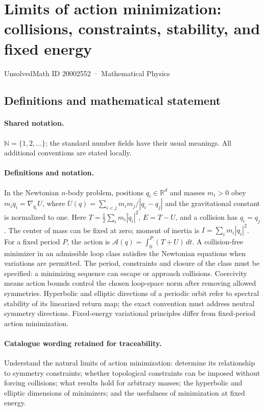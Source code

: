 \documentclass[11pt]{article}
\begin{document}
\setcounter{section}{20002551}
\section{Limits of action minimization: collisions, constraints, stability, and fixed energy}\label{20002552}
{\small UnsolvedMath ID 20002552 · Mathematical Physics}
\subsection{Definitions and mathematical statement}

\paragraph{Shared notation.}$\mathbb N=\{1,2,\ldots\}$; the standard number fields have their usual meanings. All additional conventions are stated locally.


\paragraph{Definitions and notation.}In the Newtonian $n$-body problem, positions $q_i\in\mathbb R^d$ and masses $m_i>0$ obey $m_i\ddot q_i=\nabla_{q_i}U$, where $U(q)=\sum_{i<j}m_im_j/|q_i-q_j|$ and the gravitational constant is normalized to one. Here $T=\tfrac12\sum_i m_i|\dot q_i|^2$, $E=T-U$, and a collision has $q_i=q_j$. The center of mass can be fixed at zero; moment of inertia is $I=\sum_i m_i|q_i|^2$. For a fixed period $P$, the action is $\mathcal A(q)=\int_0^P(T+U)\,dt$. A collision-free minimizer in an admissible loop class satisfies the Newtonian equations when variations are permitted. The period, constraints and closure of the class must be specified: a minimizing sequence can escape or approach collisions. Coercivity means action bounds control the chosen loop-space norm after removing allowed symmetries. Hyperbolic and elliptic directions of a periodic orbit refer to spectral stability of its linearized return map; the exact convention must address neutral symmetry directions. Fixed-energy variational principles differ from fixed-period action minimization.

\paragraph{Catalogue wording retained for traceability.}
Understand the natural limits of action minimization: determine its relationship to symmetry constraints; whether topological constraints can be imposed without forcing collisions; what results hold for arbitrary masses; the hyperbolic and elliptic dimensions of minimizers; and the usefulness of minimization at fixed energy.
\end{document}
